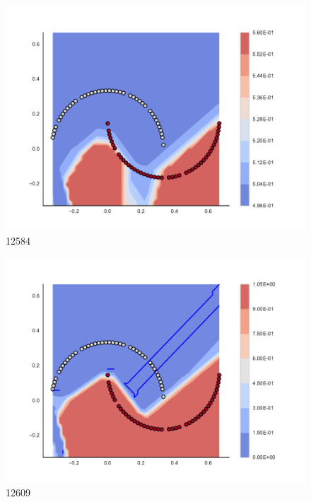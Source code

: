 \begin{subfigure}[b]{0.09\textwidth}
    \includegraphics[clip, trim=2.35cm 1.75cm 4.5cm 0cm,width=\textwidth]{img/convergence/12584.pdf}
    \caption{12584}
    \label{fig:convergence_12584}
\end{subfigure}
%
\begin{subfigure}[b]{0.09\textwidth}
    \includegraphics[clip, trim=2.35cm 1.75cm 4.5cm 0cm,width=\textwidth]{img/convergence/12609.pdf}
    \caption{12609}
    \label{fig:convergence_12609}
\end{subfigure}
%
